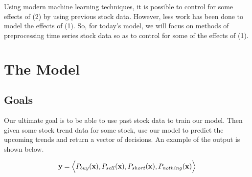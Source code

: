 \documentclass[final]{article}
\begin{document}
Using modern machine learning techniques, it is possible to control
for some effects of (2) by using previous stock data. However,
less work has been done to model the effects of (1). So, for today's
model, we will focus on methods of preprocessing time series stock
data so as to control for some of the effects of (1).




\section{The Model}

\subsection{Goals}
Our ultimate goal is to be able to use past stock data to train our
model. Then given some stock trend data for some stock, use our model
to predict the upcoming trends and return a vector of decisions. An
example of the output is shown below.

\[
  \mathbf{y} = \Bigl<P_{buy}(\mathbf{x}), P_{sell}(\mathbf{x}),
  P_{short}(\mathbf{x}), P_{nothing}(\mathbf{x})\Bigr>
\]
\end{document}
